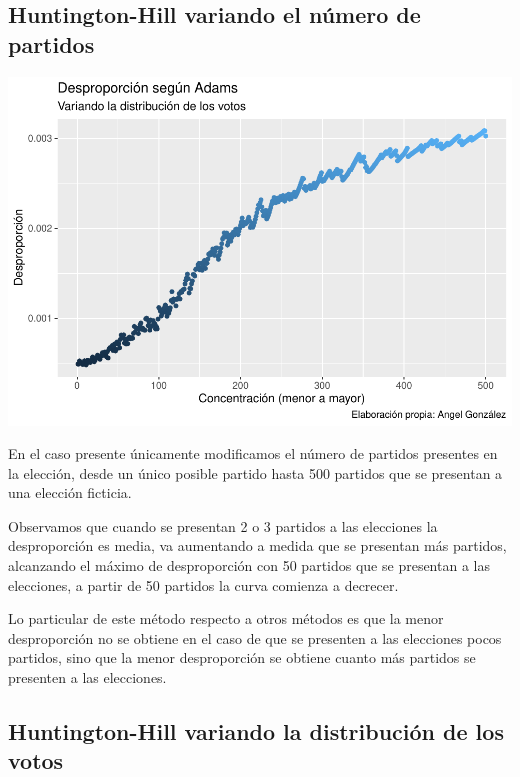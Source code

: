 \documentclass[12pt,a4paper,]{book}
\numberwithin{dummy}{section}
\theoremstyle{ocrenumbox}
\theoremstyle{blacknumex}
\theoremstyle{blacknumbox}
\theoremstyle{ocrenum}
\theoremstyle{ocrenum}
\begin{document}
\hypertarget{huntington-hill-variando-el-nuxfamero-de-partidos}{%
\subsection{Huntington-Hill variando el número de
partidos}\label{huntington-hill-variando-el-nuxfamero-de-partidos}}

\begin{center}\includegraphics[width=0.95\linewidth]{figurasR/unnamed-chunk-33-1} \end{center}

En el caso presente únicamente modificamos el número de partidos
presentes en la elección, desde un único posible partido hasta 500
partidos que se presentan a una elección ficticia.

Observamos que cuando se presentan 2 o 3 partidos a las elecciones la
desproporción es media, va aumentando a medida que se presentan más
partidos, alcanzando el máximo de desproporción con 50 partidos que se
presentan a las elecciones, a partir de 50 partidos la curva comienza a
decrecer.

Lo particular de este método respecto a otros métodos es que la menor
desproporción no se obtiene en el caso de que se presenten a las
elecciones pocos partidos, sino que la menor desproporción se obtiene
cuanto más partidos se presenten a las elecciones.

\hypertarget{huntington-hill-variando-la-distribuciuxf3n-de-los-votos}{%
\subsection{Huntington-Hill variando la distribución de los
votos}\label{huntington-hill-variando-la-distribuciuxf3n-de-los-votos}}
\end{document}
